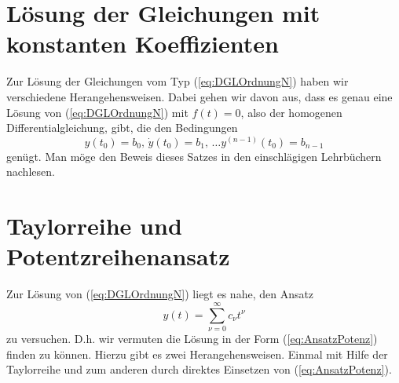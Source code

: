 \section{Lösung der Gleichungen mit konstanten Koeffizienten}
Zur Lösung der Gleichungen vom Typ (\ref{eq:DGLOrdnungN}) haben wir
verschiedene Herangehensweisen. Dabei gehen wir davon aus, dass es genau eine
Lösung von (\ref{eq:DGLOrdnungN}) mit $f(t)=0$, also der homogenen
Differentialgleichung, gibt, die den Bedingungen 
\begin{equation}
y(t_0)=b_0,\,\dot{y}(t_0)=b_1,\,\dots y^{(n-1)}(t_0)=b_{n-1}
  \label{eq:ICsGDGL}
\end{equation}
genügt. Man möge den Beweis dieses Satzes in den einschlägigen Lehrbüchern
nachlesen.
\section{Taylorreihe und  Potentzreihenansatz}
Zur Lösung von (\ref{eq:DGLOrdnungN}) liegt es nahe, den Ansatz
\begin{equation}
  y(t)=\sum\limits_{\nu=0}^{\infty}c_\nu t^\nu
  \label{eq:AnsatzPotenz}
\end{equation}
zu versuchen. D.h. wir vermuten die Lösung in der Form (\ref{eq:AnsatzPotenz})
finden zu können. Hierzu gibt es zwei Herangehensweisen. Einmal mit Hilfe der
Taylorreihe und zum anderen durch direktes Einsetzen von
(\ref{eq:AnsatzPotenz}). 

